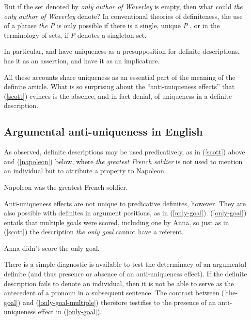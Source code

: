 But if the set denoted by \textit{only author of Waverley} is empty, then what could \textit{the only author of Waverley} denote? In conventional theories of definiteness, the use of a phrase \textit{the P} is only possible if there is a single, unique \textit{P} \citep{horn-abbott-2012}, or in the terminology of sets, if \textit{P} denotes a singleton set.

In particular, \citet{frege} and \citet{strawson50} have uniqueness as a presupposition for definite descriptions, \citet{russell} has it as an assertion, and \citet{horn-abbott-2012} have it as an implicature.

All these accounts share uniqueness as an essential part of the meaning of the definite article. What is so surprising about the ``anti-uniqueness effects'' that (\ref{scott}) evinces is the absence, and in fact denial, of uniqueness in a definite description.

\subsection{Argumental anti-uniqueness in English}
As \citet{strawson50} observed, definite descriptions may be used predicatively, as in (\ref{scott}) above and (\ref{napoleon}) below, where \textit{the greatest French soldier} is not used to mention an individual but to attribute a property to Napoleon.

\begin{exe}
	\ex \label{napoleon} Napoleon was the greatest French soldier.
\end{exe}

Anti-uniqueness effects are not unique to predicative definites, however. They are also possible with definites in argument positions, as in (\ref{only-goal}). (\ref{only-goal}) entails that multiple goals were scored, including one by Anna, so just as in (\ref{scott}) the description \textit{the only goal} cannot have a referent.

\begin{exe}
	\ex \label{only-goal} Anna didn't score the only goal.
\end{exe}

There is a simple diagnostic is available to test the determinacy of an argumental definite (and thus presence or absence of an anti-uniqueness effect). If the definite description fails to denote an individual, then it is not be able to serve as the antecedent of a pronoun in a subsequent sentence. The contrast between (\ref{the-goal}) and (\ref{only-goal-multiple}) therefore testifies to the presence of an anti-uniqueness effect in (\ref{only-goal}).

